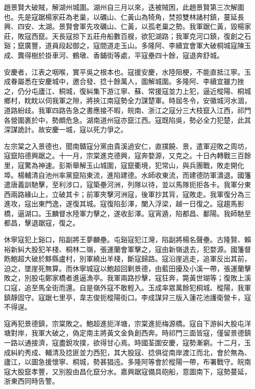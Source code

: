 \begin{pinyinscope}
趙景賢大破賊，解湖州城圍。湖州自三月以來，迭被賊困，此趙景賢第三次解圍也。先是寇踞楊家莊為老巢，以礪山、仁黃山為犄角，焚掠雙林諸村鎮，蔓延長興、四安、太湖。景賢會軍先攻礪山、仁黃，以孤老巢之勢。我軍踞仁黃，毀楊家莊，敗寇西竄。天長寇掠下五莊舟船數百艘，欲犯湖路；我軍克河口鎮，復創之石谿；竄廣豐，道員段起御之，寇間道走玉山。多隆阿、李續宜會軍大破桐城寇陳玉成、龔得樹於掛車河、鶴墩、香鋪街等處，平寇壘四十餘，寇退奔舒城。

安慶者，江表之咽喉，實平吳之根本也。寇援安慶，水陸阻梗，不能直抵江寧。玉成眷屬悉在安慶城中，邀合發、捻十餘萬人，圖解城圍。多隆阿、李續宜雖力挫之，仍分屯廬江、桐城，復糾集下游江寧、蘇、常援寇並力上犯，逼近樅陽、桐城鄉村，眈眈以伺我軍之隙，將挾江南寇勢全力謀楚軍。時屆冬令，安徽城河水涸，道路紛歧。我軍四路告急之書應接不暇，皖南、浙江之寇分三大枝竄入江西，祁門各營圍裹於中，勢頗危急。湖南道州寇亦竄江西。寇既陷吳，勢必全力犯楚，此其深謀詭計。故安慶一城，寇以死力爭之。

左宗棠之入景德也，聞南贛寇分黨由貴溪過安仁，直撲饒、景，遣軍迎敗之周坊，寇竄陷德興踞之。十一月，宗棠進克德興，寇奔婺源，又克之。十日內轉戰三百餘里，寇驚為神速。彭斯舉解玉山城圍，寇竄衢境，犯常山，與兵團戰，敗走開化埠。楊輔清自池州率黨竄陷東流，進陷建德。水師收東流，而建德防軍潰退。國籓遣唐義訓馳擊，至利涉口，寇築壘河洲，列隊以待，並以馬隊扼拒各卡。我軍分東西兩路緣山上，立破其卡；前軍夾擊河洲寇，後軍抄其背，寇敗走。我軍復分為三進攻，寇出東門逸，遂復其城。寇復陷彭澤，闌入浮梁，越一日復之。寇趨馬影橋，逼湖口。玉麟督水陸軍力擊之，遂收彭澤。寇宵遁，陷都昌、鄱陽。我師馳至都昌，擊退踞寇，復之。

休寧寇犯上谿口，陷副將王夢麟壘。屯谿寇犯江灣，陷副將楊名聲壘。古隆賢、賴裕新糾大股犯羊棧、桐林二嶺，張運蘭會軍擊之，寇由新嶺退去，犯婺源。國籓督飭鮑超大破於黟縣盧村，別軍繞出羊棧，斷寇歸路。寇沿崖逃走，追軍反出其前，迫之，墜崖死無算。而休寧城寇以鮑超回剿景德，由藍田擾及小溪一帶，張運蘭擊敗之，別股屯鄭家橋者進逼漁亭。我軍兩路抄擊，寇狂奔，斃黃世瑚等；復敗上溪口寇，追至馬全街而還。自是嶺外寇不敢輕入。玉成率眾萬餘犯桐城、樅陽，我軍鎮靜固守。寇踞七里亭，韋志俊扼樅陽街口。李成謀舁三版入蓮花池護衛營卡，寇不得逞。

寇再犯景德鎮，宗棠敗之。鮑超進扼洋塘，宗棠進扼梅源橋。寇自下游糾大股屯洋塘對岸，我軍大破之，偽定南主將黃文金負創西奔。時祁門三面皆寇，僅留景德鎮一路以通接濟，寇盡銳攻撲，欲得甘心焉。時國荃圍安慶，寇勢漸窮。十二月，玉成糾約秀成、輔清及捻匪並力西犯，其大股寇、捻俱從南岸渡江而北，會於無為、廬江，以圖急援懷寧、桐城，勢甚猖迍。多隆阿等會於樅陽一帶，布署戰守。皖南寇大股竄孝豐，又別股由昌化竄分水。嘉興踞寇備具砲船，意圖南下，寇勢蔓延，浙東西同時告警。


\end{pinyinscope}
